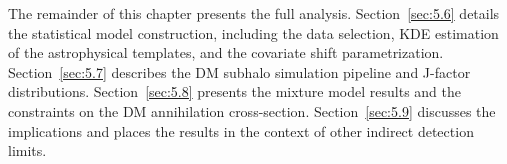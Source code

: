 The remainder of this chapter presents the full analysis.
Section~\ref{sec:5.6} details the statistical model construction, including the data selection, KDE estimation of the astrophysical templates, and the covariate shift parametrization.
Section~\ref{sec:5.7} describes the DM subhalo simulation pipeline and J-factor distributions.
Section~\ref{sec:5.8} presents the mixture model results and the constraints on the DM annihilation cross-section.
Section~\ref{sec:5.9} discusses the implications and places the results in the context of other indirect detection limits.
